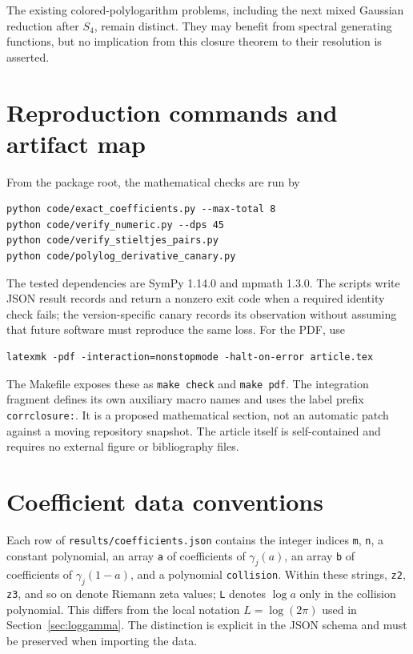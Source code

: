 \documentclass[11pt]{article}
\numberwithin{equation}{section}
\theoremstyle{definition}
\theoremstyle{remark}
\newcommand{\file}[1]{\nolinkurl{#1}}
\begin{document}
The existing colored-polylogarithm problems, including the next mixed
Gaussian reduction after $S_4$, remain distinct. They may benefit from
spectral generating functions, but no implication from this closure
theorem to their resolution is asserted.

\appendix
\section{Reproduction commands and artifact map}
\label{app:reproduce}

From the package root, the mathematical checks are run by
\begin{verbatim}
python code/exact_coefficients.py --max-total 8
python code/verify_numeric.py --dps 45
python code/verify_stieltjes_pairs.py
python code/polylog_derivative_canary.py
\end{verbatim}
The tested dependencies are SymPy 1.14.0 and mpmath 1.3.0. The scripts
write JSON result records and return a nonzero exit code when a required
identity check fails; the version-specific canary records its observation
without assuming that future software must reproduce the same loss.
For the PDF, use
\begin{verbatim}
latexmk -pdf -interaction=nonstopmode -halt-on-error article.tex
\end{verbatim}
The Makefile exposes these as \texttt{make check} and \texttt{make pdf}.
The integration fragment defines its own auxiliary macro names and uses
the label prefix \texttt{corrclosure:}. It is a proposed mathematical
section, not an automatic patch against a moving repository snapshot.
The article itself is self-contained and requires no external figure or
bibliography files.

\section{Coefficient data conventions}

Each row of \file{results/coefficients.json} contains the integer indices
\texttt{m}, \texttt{n}, a constant polynomial, an array \texttt{a} of
coefficients of $\gamma_j(a)$, an array \texttt{b} of coefficients of
$\gamma_j(1-a)$, and a polynomial \texttt{collision}.
Within these strings, \texttt{z2}, \texttt{z3}, and so on denote Riemann
zeta values; \texttt{L} denotes $\log a$ only in the collision polynomial.
This differs from the local notation $L=\log(2\pi)$ used in
Section~\ref{sec:loggamma}. The distinction is explicit in the JSON
schema and must be preserved when importing the data.
\end{document}
